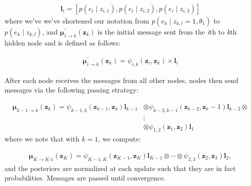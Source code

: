 \documentclass{article}
\begin{document}
\begin{equation} \label{likelihood_vector}
    \begin{aligned}
        \textbf{l$_i$} = \left[\textit{p}\left(\textit{e$_i$}\mid\textit{z$_{i,1}$}\right), \textit{p}\left(\textit{e$_i$}\mid\textit{z$_{i,2}$}\right), \textit{p}\left(\textit{e$_i$}\mid\textit{z$_{i,3}$}\right)\right]
    \end{aligned}
\end{equation} where we've we've shortened our notation from  \textit{p}$\left(\textit{e$_k$}\mid\textit{z$_{k,l}$} = 1, \textit{$\theta_1$}\right)$ to $\textit{p}\left(\textit{e$_k$}\mid\textit{z$_{k,l}$}\right)$, and $\pmb{\mu}^\prime_{i \rightarrow{\textit{k}}}\left(\textbf{z$_k$}\right)$ is the initial message sent from the \textit{i}th to \textit{k}th hidden node and is defined as follows:

\begin{equation} \label{fclv_initMsg}
    \begin{aligned}
        \pmb{\mu}^\prime_{i \rightarrow{\textit{k}}}\left(\textbf{z$_k$}\right) = \textit{$\psi_{i,k}$}\left(\textbf{z$_i$}, \textbf{z$_k$}\right) \times \textbf{l$_i$}
    \end{aligned}
\end{equation}

After each node receives the messages from all other nodes, nodes then send messages via the following passing strategy:

\begin{equation} \label{msg_passing}
    \begin{aligned}
        \pmb{\mu}_{k-1\rightarrow{\textit{k}}}\left(\textbf{z$_k$}\right) = \textit{$\psi_{k-1,k}$}\left( \textbf{z$_{k-1}$},\textbf{z$_k$}\right)\textbf{l$_{k-1}$} &\otimes \textit{$\psi_{k-2,k-1}$}\left( \textbf{z$_{k-2}$},\textbf{z$_k-1$}\right)\textbf{l$_{k-2}$} \otimes\\& \vdots\\ &\otimes \textit{$\psi_{1,2}$}\left(\textbf{z$_1$},\textbf{z$_2$}\right)\textbf{l$_{1}$}
    \end{aligned}
\end{equation} where we note that with $\textit{k} = 1$, we compute: 

\begin{equation} \label{msg_passing_node1}
    \begin{aligned}
        \pmb{\mu}_{K\rightarrow{\textit{K-1}}}\left(\textbf{z$_K$}\right) = \textit{$\psi_{K-1,K}$}\left( \textbf{z$_{K-1}$},\textbf{z$_K$}\right)\textbf{l$_{K-1}$} \otimes \cdots \otimes\textit{$\psi_{2,3}$}\left(\textbf{z$_2$},\textbf{z$_3$}\right)\textbf{l$_{2}$}, 
    \end{aligned}
\end{equation} and the posteriors are normalized at each update such that they are in fact probabilities. Messages are passed until convergence. 
\end{document}
